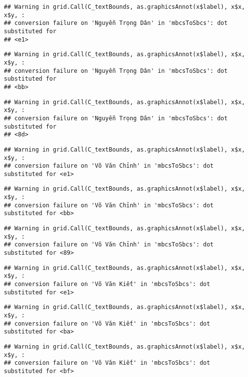 \documentclass[
]{article}
\begin{document}
\begin{verbatim}
## Warning in grid.Call(C_textBounds, as.graphicsAnnot(x$label), x$x, x$y, :
## conversion failure on 'Nguyễn Trọng Dân' in 'mbcsToSbcs': dot substituted for
## <e1>
\end{verbatim}

\begin{verbatim}
## Warning in grid.Call(C_textBounds, as.graphicsAnnot(x$label), x$x, x$y, :
## conversion failure on 'Nguyễn Trọng Dân' in 'mbcsToSbcs': dot substituted for
## <bb>
\end{verbatim}

\begin{verbatim}
## Warning in grid.Call(C_textBounds, as.graphicsAnnot(x$label), x$x, x$y, :
## conversion failure on 'Nguyễn Trọng Dân' in 'mbcsToSbcs': dot substituted for
## <8d>
\end{verbatim}

\begin{verbatim}
## Warning in grid.Call(C_textBounds, as.graphicsAnnot(x$label), x$x, x$y, :
## conversion failure on 'Võ Văn Chỉnh' in 'mbcsToSbcs': dot substituted for <e1>
\end{verbatim}

\begin{verbatim}
## Warning in grid.Call(C_textBounds, as.graphicsAnnot(x$label), x$x, x$y, :
## conversion failure on 'Võ Văn Chỉnh' in 'mbcsToSbcs': dot substituted for <bb>
\end{verbatim}

\begin{verbatim}
## Warning in grid.Call(C_textBounds, as.graphicsAnnot(x$label), x$x, x$y, :
## conversion failure on 'Võ Văn Chỉnh' in 'mbcsToSbcs': dot substituted for <89>
\end{verbatim}

\begin{verbatim}
## Warning in grid.Call(C_textBounds, as.graphicsAnnot(x$label), x$x, x$y, :
## conversion failure on 'Võ Văn Kiết' in 'mbcsToSbcs': dot substituted for <e1>
\end{verbatim}

\begin{verbatim}
## Warning in grid.Call(C_textBounds, as.graphicsAnnot(x$label), x$x, x$y, :
## conversion failure on 'Võ Văn Kiết' in 'mbcsToSbcs': dot substituted for <ba>
\end{verbatim}

\begin{verbatim}
## Warning in grid.Call(C_textBounds, as.graphicsAnnot(x$label), x$x, x$y, :
## conversion failure on 'Võ Văn Kiết' in 'mbcsToSbcs': dot substituted for <bf>
\end{verbatim}
\end{document}
